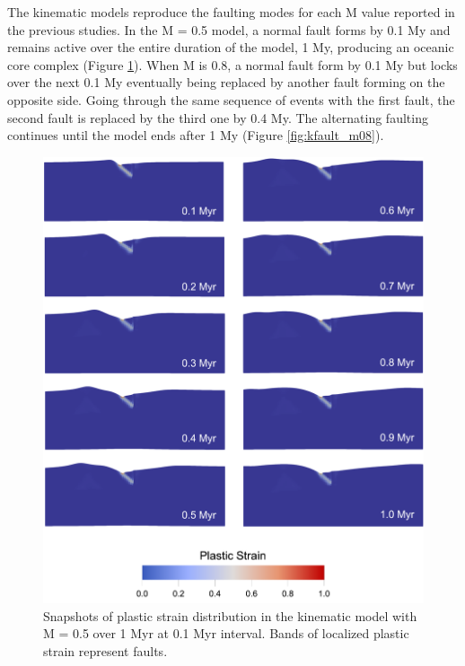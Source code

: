 \documentclass[letterpaper,12pt,notitle]{memphisthesis}                     %
\begin{document}
The kinematic models reproduce the faulting modes for each M value reported in the previous studies. In the M = 0.5 model, a normal fault forms by 0.1 My and remains active over the entire duration of the model, 1 My, producing an oceanic core complex (Figure \ref{fig:kfault_m05}). When M is 0.8, a normal fault form by 0.1 My but locks over the next 0.1 My eventually being replaced by another fault forming on the opposite side. Going through the same sequence of events with the first fault, the second fault is replaced by the third one by 0.4 My. The alternating faulting continues until the model ends after 1 My (Figure \ref{fig:kfault_m08}).
%
\begin{figure}[!htb]
	\centering
	\includegraphics[width=0.9\linewidth]{./figs/kfault_m05.png}
	\caption{ Snapshots of plastic strain distribution in the kinematic model with M = 0.5 over 1 Myr at 0.1 Myr interval. Bands of localized plastic strain represent faults.}
	\label{fig:kfault_m05}
\end{figure}
\end{document}
